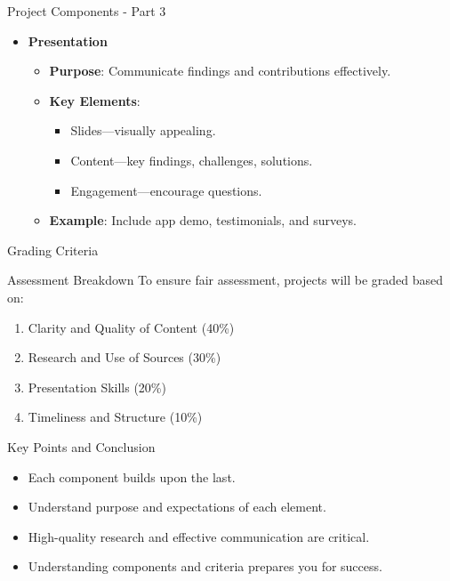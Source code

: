 \documentclass[aspectratio=169]{beamer}
\begin{document}
\begin{frame}[fragile]{Project Components - Part 3}
    \begin{itemize}
        \item \textbf{Presentation}
        \begin{itemize}
            \item \textbf{Purpose}: Communicate findings and contributions effectively.
            \item \textbf{Key Elements}:
            \begin{itemize}
                \item Slides—visually appealing.
                \item Content—key findings, challenges, solutions.
                \item Engagement—encourage questions.
            \end{itemize}
            \item \textbf{Example}: Include app demo, testimonials, and surveys.
        \end{itemize}
    \end{itemize}
\end{frame}

\begin{frame}[fragile]{Grading Criteria}
    \begin{block}{Assessment Breakdown}
        To ensure fair assessment, projects will be graded based on:
    \end{block}
    \begin{enumerate}
        \item Clarity and Quality of Content (40\%)
        \item Research and Use of Sources (30\%)
        \item Presentation Skills (20\%)
        \item Timeliness and Structure (10\%)
    \end{enumerate}
\end{frame}

\begin{frame}[fragile]{Key Points and Conclusion}
    \begin{itemize}
        \item Each component builds upon the last.
        \item Understand purpose and expectations of each element.
        \item High-quality research and effective communication are critical.
        \item Understanding components and criteria prepares you for success.
    \end{itemize}
\end{frame}
\end{document}
